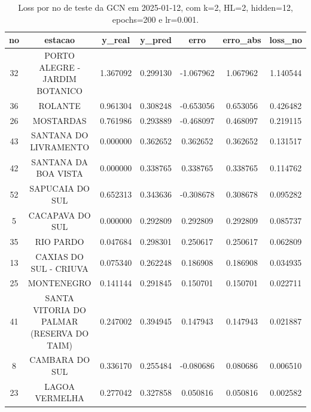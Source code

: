 \begin{table}[h]
\centering
\caption{Loss por no de teste da GCN em 2025-01-12, com k=2, HL=2, hidden=12, epochs=200 e lr=0.001.}
\label{tab:gcn_loss_k2_hl2_h12_e200_d20250112}
\begin{tabular}{ccccccc}
\toprule
no & estacao & y\_real & y\_pred & erro & erro\_abs & loss\_no \\
\midrule
32 & PORTO ALEGRE - JARDIM BOTANICO & 1.367092 & 0.299130 & -1.067962 & 1.067962 & 1.140544 \\
36 & ROLANTE & 0.961304 & 0.308248 & -0.653056 & 0.653056 & 0.426482 \\
26 & MOSTARDAS & 0.761986 & 0.293889 & -0.468097 & 0.468097 & 0.219115 \\
43 & SANTANA DO LIVRAMENTO & 0.000000 & 0.362652 & 0.362652 & 0.362652 & 0.131517 \\
42 & SANTANA DA BOA VISTA & 0.000000 & 0.338765 & 0.338765 & 0.338765 & 0.114762 \\
52 & SAPUCAIA DO SUL & 0.652313 & 0.343636 & -0.308678 & 0.308678 & 0.095282 \\
5 & CACAPAVA DO SUL & 0.000000 & 0.292809 & 0.292809 & 0.292809 & 0.085737 \\
35 & RIO PARDO & 0.047684 & 0.298301 & 0.250617 & 0.250617 & 0.062809 \\
13 & CAXIAS DO SUL - CRIUVA & 0.075340 & 0.262248 & 0.186908 & 0.186908 & 0.034935 \\
25 & MONTENEGRO & 0.141144 & 0.291845 & 0.150701 & 0.150701 & 0.022711 \\
41 & SANTA VITORIA DO PALMAR (RESERVA DO TAIM) & 0.247002 & 0.394945 & 0.147943 & 0.147943 & 0.021887 \\
8 & CAMBARA DO SUL & 0.336170 & 0.255484 & -0.080686 & 0.080686 & 0.006510 \\
23 & LAGOA VERMELHA & 0.277042 & 0.327858 & 0.050816 & 0.050816 & 0.002582 \\
\bottomrule
\end{tabular}
\end{table}
